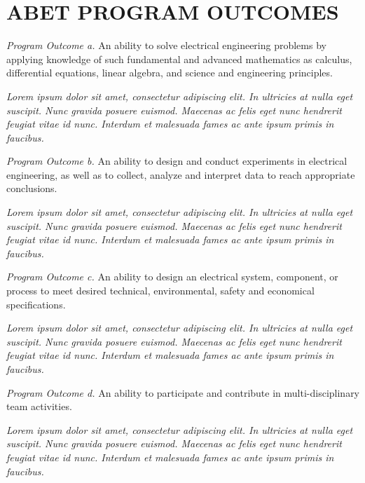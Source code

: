 \documentclass[letterpaper]{kuthesis}
\begin{document}
\chapter{ABET PROGRAM OUTCOMES}
\singlespace
\textit{Program Outcome a.}  An ability to solve electrical engineering problems by applying knowledge of such fundamental and advanced mathematics as calculus, differential equations, linear algebra, and science and engineering principles.
\begin{adjustwidth}{0.5in}{0in}
\textit{Lorem ipsum dolor sit amet, consectetur adipiscing elit. In ultricies at nulla eget suscipit. Nunc gravida posuere euismod. Maecenas ac felis eget nunc hendrerit feugiat vitae id nunc. Interdum et malesuada fames ac ante ipsum primis in faucibus. }\\
\end{adjustwidth} 
\textit{Program Outcome b.}  An ability to design and conduct experiments in electrical engineering, as well as to collect, analyze and interpret data to reach appropriate conclusions.
\begin{adjustwidth}{0.5in}{0in}
\textit{Lorem ipsum dolor sit amet, consectetur adipiscing elit. In ultricies at nulla eget suscipit. Nunc gravida posuere euismod. Maecenas ac felis eget nunc hendrerit feugiat vitae id nunc. Interdum et malesuada fames ac ante ipsum primis in faucibus. }\\
\end{adjustwidth} 
\textit{Program Outcome c.}  An ability to design an electrical system, component, or process to meet desired technical, environmental, safety and economical specifications.
\begin{adjustwidth}{0.5in}{0in}
\textit{Lorem ipsum dolor sit amet, consectetur adipiscing elit. In ultricies at nulla eget suscipit. Nunc gravida posuere euismod. Maecenas ac felis eget nunc hendrerit feugiat vitae id nunc. Interdum et malesuada fames ac ante ipsum primis in faucibus. }\\
\end{adjustwidth} 
\textit{Program Outcome d.}  An ability to participate and contribute in multi-disciplinary team activities.
\begin{adjustwidth}{0.5in}{0in}
\textit{Lorem ipsum dolor sit amet, consectetur adipiscing elit. In ultricies at nulla eget suscipit. Nunc gravida posuere euismod. Maecenas ac felis eget nunc hendrerit feugiat vitae id nunc. Interdum et malesuada fames ac ante ipsum primis in faucibus. }\\
\end{adjustwidth} 
\end{document}
